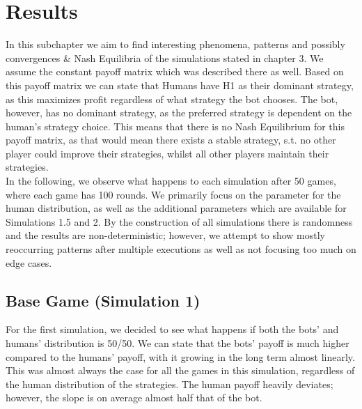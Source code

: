\documentclass{article}
\begin{document}
\section{Results} %
In this subchapter we aim to find interesting phenomena, patterns and possibly convergences \& Nash Equilibria of the simulations stated in chapter 3. We assume the constant payoff matrix which was described there as well. Based on this payoff matrix we can state that Humans have H1 as their dominant strategy, as this maximizes profit regardless of what strategy the bot chooses. The bot, however, has no dominant strategy, as the preferred strategy is dependent on the human's strategy choice. This means that there is no Nash Equilibrium for this payoff matrix, as that would mean there exists a stable strategy, s.t. no other player could improve their strategies, whilst all other players maintain their strategies. \\
In the following, we observe what happens to each simulation after 50 games, where each game has 100 rounds. We primarily focus on the parameter for the human distribution, as well as the additional parameters which are available for Simulations 1.5 and 2. By the construction of all simulations there is randomness and the results are non-deterministic; however, we attempt to show mostly reoccurring patterns after multiple executions as well as not focusing too much on edge cases. 
\subsection{Base Game (Simulation 1)}
For the first simulation, we decided to see what happens if both the bots' and humans' distribution is 50/50. We can state that the bots' payoff is much higher compared to the humans' payoff, with it growing in the long term almost linearly. This was almost always the case for all the games in this simulation, regardless of the human distribution of the strategies. The human payoff heavily deviates; however, the slope is on average almost half that of the bot. 
\end{document}
